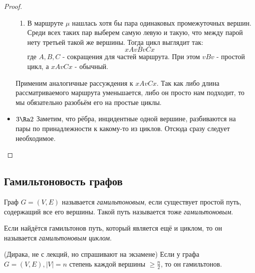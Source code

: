 \begin{proof}
\begin{itemize}
\begin{enumerate}
			\item В маршруте $\mu$ нашлась хотя бы пара одинаковых промежуточных вершин. Среди всех таких пар выберем самую левую и такую, что между парой нету третьей такой же вершины. Тогда цикл выглядит так:
			\[
				xAvBvCx
			\]
			где $A, B, C$ - сокращения для частей маршрута. При этом $vBv$ - простой цикл, а $xAvCx$ - обычный.
		\end{enumerate}
		Применим аналогичные рассуждения к $xAvCx$. Так как либо длина рассматриваемого маршрута уменьшается, либо он просто нам подходит, то мы обязательно разобьём его на простые циклы.
		
		\item $3 \Ra 2$ Заметим, что рёбра, инцидентные одной вершине, разбиваются на пары по принадлежности к какому-то из циклов. Отсюда сразу следует необходимое.
	\end{itemize}
\end{proof}

\subsection{Гамильтоновость графов}

\begin{definition}
	Граф $G = (V, E)$ называется \textit{гамильтоновым}, если существует простой путь, содержащий все его вершины. Такой путь называется тоже \textit{гамильтоновым}.
\end{definition}

\begin{definition}
	Если найдётся гамильтонов путь, который является ещё и циклом, то он называется \textit{гамильтоновым циклом}.
\end{definition}

\begin{theorem} (Дирака, не с лекций, но спрашивают на экзамене)
	Если у графа $G = (V, E), |V| = n$ степень каждой вершины $\ge \frac{n}{2}$, то он гамильтонов.
\end{theorem}

